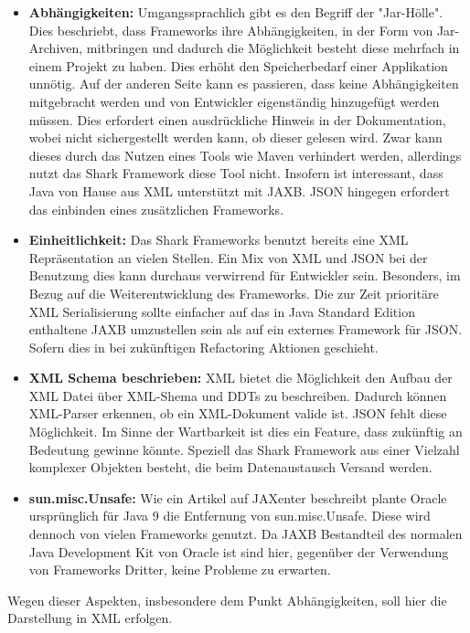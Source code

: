 \documentclass[a4paper]{article}
\begin{document}
	\begin{itemize}
		\item \textbf{Abhängigkeiten:} Umgangssprachlich gibt es den Begriff der
		"Jar-Hölle". Dies beschriebt, dass Frameworks ihre Abhängigkeiten, in der
		Form von Jar-Archiven, mitbringen und dadurch die Möglichkeit besteht diese
		mehrfach in einem Projekt zu haben. Dies erhöht den Speicherbedarf einer
		Applikation unnötig. Auf der anderen Seite kann es passieren, dass keine
		Abhängigkeiten mitgebracht werden und  von Entwickler eigenständig
		hinzugefügt werden müssen. Dies erfordert einen ausdrückliche Hinweis in
		der Dokumentation, wobei nicht sichergestellt werden kann, ob dieser
		gelesen	wird. Zwar kann dieses durch das Nutzen eines Tools wie Maven
		verhindert werden, allerdings nutzt das Shark Framework diese Tool nicht.
		Insofern ist interessant, dass Java von Hause aus XML unterstützt mit JAXB.
		JSON hingegen erfordert das einbinden eines zusätzlichen Frameworks.
		\item \textbf{Einheitlichkeit:} Das Shark Frameworks benutzt bereits eine
		XML Repräsentation an vielen Stellen. Ein Mix von XML und JSON bei der
		Benutzung dies kann durchaus verwirrend für Entwickler sein. Besonders,
		im Bezug auf die Weiterentwicklung des Frameworks. Die zur Zeit prioritäre
		XML Serialisierung sollte einfacher auf das in Java Standard Edition
		enthaltene JAXB umzustellen sein als auf ein externes Framework für JSON.
		Sofern dies in bei zukünftigen Refactoring Aktionen geschieht.
		\item \textbf{XML Schema beschrieben:} XML bietet die Möglichkeit den
		Aufbau der XML Datei über XML-Shema und DDTs zu beschreiben. Dadurch
		können XML-Parser erkennen, ob ein XML-Dokument valide ist. JSON fehlt
		diese Möglichkeit. Im Sinne der Wartbarkeit ist dies ein Feature, dass
		zukünftig an Bedeutung gewinne könnte. Speziell das Shark Framework
		aus einer Vielzahl komplexer Objekten besteht, die beim Datenaustausch
		Versand werden.
		\item \textbf{sun.misc.Unsafe:} Wie ein Artikel auf JAXenter \cite{unsafe}
		beschreibt plante Oracle ursprünglich für Java 9 die Entfernung von
		sun.misc.Unsafe. Diese wird dennoch von vielen Frameworks genutzt. Da
		JAXB Bestandteil des normalen Java Development Kit von Oracle ist sind
		hier, gegenüber der Verwendung von Frameworks Dritter, keine Probleme zu
		erwarten.
		
	\end{itemize} 	
	
	Wegen dieser Aspekten, insbesondere dem Punkt Abhängigkeiten, soll hier die
	Darstellung in XML erfolgen.
	
\end{document}
